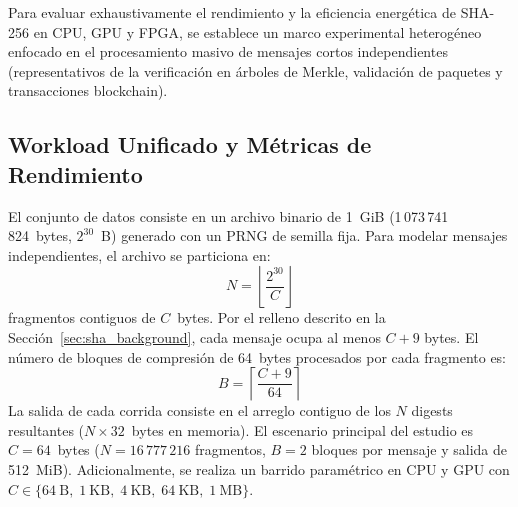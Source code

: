 \documentclass[conference]{IEEEtran}
\begin{document}
Para evaluar exhaustivamente el rendimiento y la eficiencia energética de SHA-256 en CPU, GPU y FPGA, se establece un marco experimental heterogéneo enfocado en el procesamiento masivo de mensajes cortos independientes (representativos de la verificación en árboles de Merkle, validación de paquetes y transacciones blockchain).

\subsection{Workload Unificado y Métricas de Rendimiento}

El conjunto de datos consiste en un archivo binario de 1~GiB (1\,073\,741\,824~bytes, $2^{30}$~B) generado con un PRNG de semilla fija. Para modelar mensajes independientes, el archivo se particiona en:
\begin{equation}
N = \left\lfloor \frac{2^{30}}{C} \right\rfloor
\label{eq:num_chunks}
\end{equation}
fragmentos contiguos de $C$~bytes. Por el relleno descrito en la Sección~\ref{sec:sha_background}, cada mensaje ocupa al menos $C + 9$ bytes. El número de bloques de compresión de 64~bytes procesados por cada fragmento es:
\begin{equation}
B = \left\lceil \frac{C + 9}{64} \right\rceil
\label{eq:blocks}
\end{equation}
La salida de cada corrida consiste en el arreglo contiguo de los $N$ digests resultantes ($N \times 32$~bytes en memoria). El escenario principal del estudio es $C = 64$~bytes ($N = 16\,777\,216$ fragmentos, $B = 2$ bloques por mensaje y salida de 512~MiB). Adicionalmente, se realiza un barrido paramétrico en CPU y GPU con $C \in \{64~\text{B},\; 1~\text{KB},\; 4~\text{KB},\; 64~\text{KB},\; 1~\text{MB}\}$.
\end{document}
